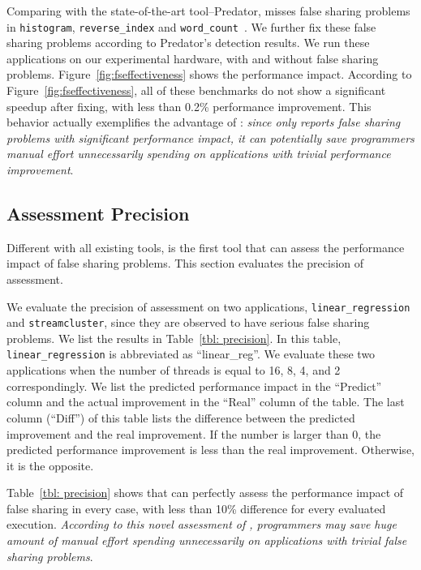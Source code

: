 Comparing with the state-of-the-art tool--Predator, \cheetah{} misses false sharing problems in  \texttt{histogram}, \texttt{reverse\_index} and \texttt{word\_count}~\cite{Predator}. We further fix these false sharing problems according to Predator's detection results. We run these applications on our experimental hardware, with and without false sharing problems. Figure~\ref{fig:fseffectiveness} shows the performance impact. According to Figure~\ref{fig:fseffectiveness}, all of these benchmarks do not show a significant speedup after fixing, with less than 0.2\% performance improvement. This behavior actually exemplifies the advantage of \Cheetah{}: \emph{since \cheetah{} only reports false sharing problems with significant performance impact, it can potentially save programmers manual effort unnecessarily spending on applications with trivial performance improvement}. 

\subsection{Assessment Precision}
\label{sec:precision}

Different with all existing tools, \cheetah{} is the first tool that can assess the performance impact of false sharing problems. This section evaluates the precision of assessment. 

We evaluate the precision of assessment on two applications, \texttt{linear\_regression} and \texttt{streamcluster}, since they are observed to have serious false sharing problems. We list the results in Table~\ref{tbl: precision}. In this table, \texttt{linear\_regression} is abbreviated as ``linear\_reg''.  We evaluate these two applications when the number of threads is equal to 16, 8, 4, and 2 correspondingly. We list the predicted performance impact in the ``Predict'' column and the actual improvement in the ``Real'' column of the table. The last column (``Diff'') of this table lists the difference between the predicted improvement and the real improvement. If the number is larger than 0, the predicted performance improvement is less than the real improvement. Otherwise, it is the opposite. 

Table~\ref{tbl: precision} shows that \cheetah{} can perfectly assess the performance impact of false sharing in every case, with less than 10\% difference for every evaluated execution. %
\emph{According to this novel assessment of \cheetah{}, programmers may save huge amount of manual effort spending unnecessarily on applications with trivial false sharing problems}. 

